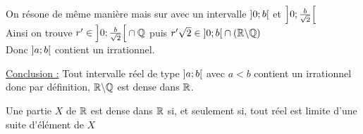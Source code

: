 \begin{dem}
\begin{itemize}
\begin{itemize}
            On résone de même manière mais sur avec un intervalle \(\left]0;b\right[\) et \(\left]0;\frac{b}{\sqrt{2}}\right[\)\\
            Ainsi on trouve \(r'\in \left]0;\frac{b}{\sqrt{2}}\right[\cap \mathbb{Q}\) puis \(r'\sqrt{2} \in \left]0;b\right[\cap\left(\mathbb{R}\backslash\mathbb{Q}\right)\)\\
            Donc \(\left]a;b\right[\) contient un irrationnel.
        \end{itemize}
    \end{itemize}
    \underline{Conclusion :} Tout intervalle réel de type \(\left]a;b\right[\) avec \(a<b\) contient un irrationnel donc par définition, \(\mathbb{R}\backslash\mathbb{Q}\) est dense dans \(\mathbb{R}\).
\end{dem}

\begin{theo}
    Une partie \(X\) de \(\mathbb{R}\) est dense dans \(\mathbb{R}\) si, et seulement si, tout réel est limite d'une suite d'élément de \(X\)
\end{theo}
